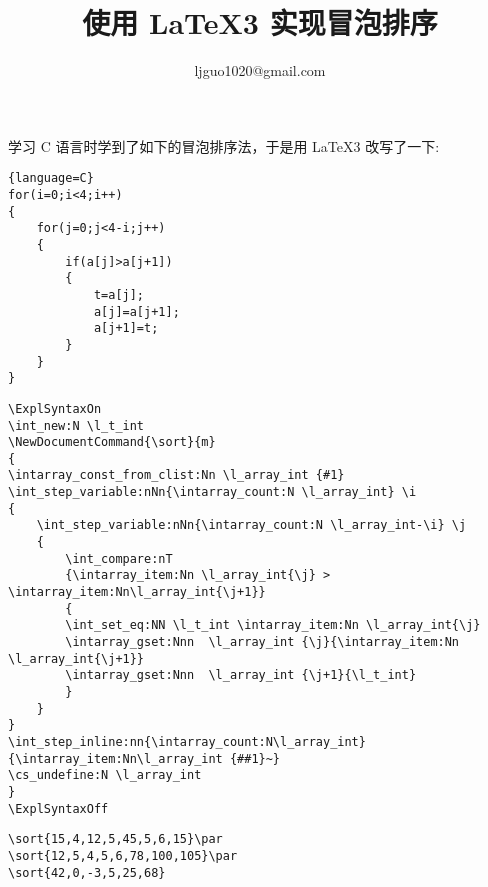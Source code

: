 \documentclass{ctexart}
\title{使用 \LaTeX3 实现冒泡排序}
\author{ljguo1020@gmail.com}
\begin{document}
    \maketitle
学习 C 语言时学到了如下的冒泡排序法，于是用 \LaTeX3 改写了一下:
\begin{lstlisting}{language=C}
for(i=0;i<4;i++)
{
    for(j=0;j<4-i;j++)
    {
        if(a[j]>a[j+1])
        {
            t=a[j];
            a[j]=a[j+1];
            a[j+1]=t;
        }
    }
}
\end{lstlisting}
\begin{lstlisting}
\ExplSyntaxOn
\int_new:N \l_t_int
\NewDocumentCommand{\sort}{m}
{
\intarray_const_from_clist:Nn \l_array_int {#1}                 
\int_step_variable:nNn{\intarray_count:N \l_array_int} \i 
{
    \int_step_variable:nNn{\intarray_count:N \l_array_int-\i} \j 
    {        
        \int_compare:nT 
        {\intarray_item:Nn \l_array_int{\j} > \intarray_item:Nn\l_array_int{\j+1}}
        {  
        \int_set_eq:NN \l_t_int \intarray_item:Nn \l_array_int{\j}   
        \intarray_gset:Nnn  \l_array_int {\j}{\intarray_item:Nn \l_array_int{\j+1}}
        \intarray_gset:Nnn  \l_array_int {\j+1}{\l_t_int}  
        }
    }
}
\int_step_inline:nn{\intarray_count:N\l_array_int}{\intarray_item:Nn\l_array_int {##1}~}
\cs_undefine:N \l_array_int
}
\ExplSyntaxOff
\end{lstlisting}
\begin{lstlisting}
\sort{15,4,12,5,45,5,6,15}\par 
\sort{12,5,4,5,6,78,100,105}\par 
\sort{42,0,-3,5,25,68}
\end{lstlisting}

\par 
{}\par 
{}
\end{document}
